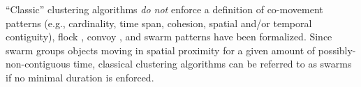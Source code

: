 \documentclass[
]{ceurart}
\begin{document}
``Classic'' clustering algorithms \textit{do not} enforce a definition of co-movement patterns (e.g., cardinality, time span, cohesion, spatial and/or temporal contiguity), flock \citep{DBLP:conf/gis/GudmundssonK06}, convoy \citep{DBLP:journals/pvldb/JeungYZJS08}, and swarm \citep{DBLP:conf/ssdbm/AungT10} patterns have been formalized.
Since swarm \citep{DBLP:conf/ssdbm/AungT10} groups objects moving in spatial proximity for a given amount of possibly-non-contiguous time,
classical clustering algorithms can be referred to as swarms if no minimal duration is enforced.
\end{document}
